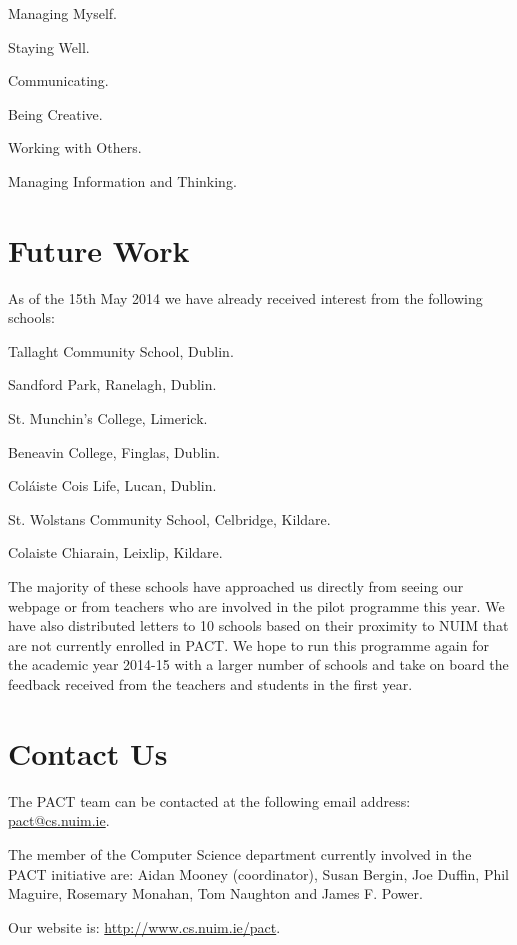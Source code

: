 \documentclass[a4paper]{article}
\begin{document}
\begin{compactenum}
  \item Managing Myself.
  \item Staying Well.
  \item Communicating.
  \item Being Creative.
  \item Working with Others.
  \item Managing Information and Thinking.
\end{compactenum}



\section{Future Work}
As of the 15th May 2014 we have already received interest from the following schools:
\begin{compactitem}
  \item Tallaght Community School, Dublin. 
  \item Sandford Park, Ranelagh, Dublin.
  \item St. Munchin's College, Limerick.
  \item Beneavin College, Finglas, Dublin.
  \item Coláiste Cois Life, Lucan, Dublin.
  \item St. Wolstans Community School, Celbridge, Kildare. 
  \item Colaiste Chiarain, Leixlip, Kildare. 
\end{compactitem}  

The majority of these schools have approached us directly from seeing our webpage or from teachers who are involved in the pilot programme this year. We have also distributed letters to 10 schools based on their proximity to NUIM that are not currently enrolled in PACT. We hope to run this programme again for the academic year 2014-15 with a larger number of schools and take on board the feedback received from the teachers and students in the first year.

\section{Contact Us}
The PACT team can be contacted at the following email address: \url{pact@cs.nuim.ie}.

The member of the Computer Science department currently involved in the PACT initiative are:
Aidan Mooney (coordinator),
Susan Bergin,
Joe Duffin,
Phil Maguire,
Rosemary Monahan,
Tom Naughton and
James F. Power. 




Our website is: \url{http://www.cs.nuim.ie/pact}.



\end{document}

